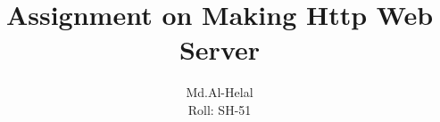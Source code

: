 \documentclass{article}
\begin{document}
\title{Assignment on Making Http Web Server}
\author{Md.Al-Helal\\Roll: SH-51}
\maketitle
\lstset{showstringspaces=false}

\end{document}
